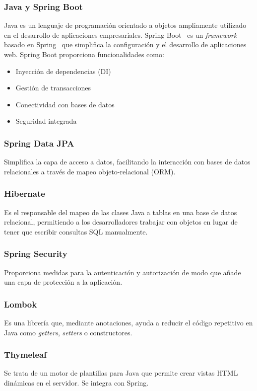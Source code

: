 \subsubsection{Java y Spring Boot}
Java es un lenguaje de programación orientado a objetos ampliamente utilizado en el desarrollo de aplicaciones empresariales. Spring Boot~\cite{spring-boot} es un \emph{framework}~\cite{framework} basado en Spring~\cite{spring} que simplifica la configuración y el desarrollo de aplicaciones web.
Spring Boot proporciona funcionalidades como:
\begin{itemize}
\tightlist
\item
Inyección de dependencias (DI)
\item
Gestión de transacciones
\item
Conectividad con bases de datos
\item
Seguridad integrada
\end{itemize}

\subsubsection{Spring Data JPA~\cite{spring-data-jpa}}
Simplifica la capa de acceso a datos, facilitando la interacción con bases de datos relacionales a través de mapeo objeto-relacional (ORM).

\subsubsection{Hibernate~\cite{hibernate}}
Es el responsable del mapeo de las clases Java a tablas en una base de datos relacional, permitiendo a los desarrolladores trabajar con objetos en lugar de tener que escribir consultas SQL manualmente.

\subsubsection{Spring Security~\cite{spring-security}}
Proporciona medidas para la autenticación y autorización de modo que añade una capa de protección a la aplicación.

\subsubsection{Lombok~\cite{lombok}}
Es una librería que, mediante anotaciones, ayuda a reducir el código repetitivo en Java como \emph{getters}, \emph{setters} o constructores.

\subsubsection{Thymeleaf~\cite{thymeleaf}}
Se trata de un motor de plantillas para Java que permite crear vistas HTML dinámicas en el servidor. Se integra con Spring.

